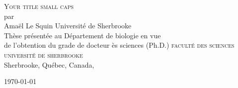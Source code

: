 \documentclass[titlepage,oneside,letterpaper,openright,12pt]{report}
\theoremstyle{theo}
\begin{document}
\newpage
\thispagestyle{empty}
\mbox{}

\begin{titlepage}
	\begin{center}
		\textsc{Your title small caps} \\
	\vspace{2cm}
	par \\
	\vspace{2cm}
	Amaël Le Squin
	\vspace{1cm}
	Université de Sherbrooke \\
	\vspace{1cm}
	Thèse présentée au Département de biologie en vue \\
	de l'obtention du grade de docteur ès sciences (Ph.D.)
	\vfill
	\textsc{faculté des sciences} \\
	\textsc{université de sherbrooke} \\
	\vspace{2cm}
	Sherbrooke, Québec, Canada, \begin{french} \monthyeardate\today \end{french}
	\end{center}	
\end{titlepage}
\end{document}
